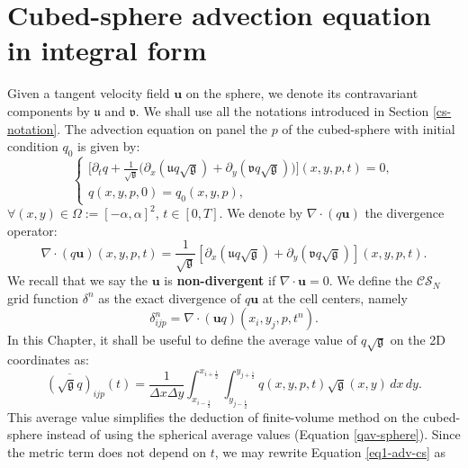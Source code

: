 \section{Cubed-sphere advection equation in integral form}
\label{chp-cs-adv}
Given a tangent velocity field $\boldsymbol{u}$ on the sphere, we denote its
contravariant components by $\mathfrak{u}$ and $\mathfrak{v}$.
We shall use all the notations introduced in Section \ref{cs-notation}.
The advection equation on panel the $p$ of the cubed-sphere with initial condition $q_0$ is given by:
\begin{equation}
	\begin{cases}
		\label{eq1-adv-cs}
		\bigg[{\partial}_t{q}+
		\frac{1}{\sqrt{\mathfrak{g}}}\bigg(
		{\partial}_x{(\mathfrak{u} q \sqrt{\mathfrak{g}})}+
		{\partial}_y{(\mathfrak{v} q \sqrt{\mathfrak{g}})}
		\bigg)\bigg](x,y,p,t)
		= 0,\\
		q(x,y,p,0) = q_0(x,y,p),
	\end{cases}
\end{equation}
$\forall (x,y) \in \Omega := [-\alpha,\alpha]^2$, $t\in[0,T]$.
We denote by $\nabla \cdot (q\boldsymbol{u})$ the divergence operator:
\begin{equation}
	\label{advcs:eqdiv}
	\nabla \cdot (q\boldsymbol{u})(x, y, p, t) =  \frac{1}{\sqrt{\mathfrak{g}}}
	[{\partial_x (\mathfrak{u}q\sqrt{\mathfrak{g}})} + {\partial_y (\mathfrak{v}q\sqrt{\mathfrak{g}})}](x, y, p, t).
\end{equation}
We recall that we say the $\boldsymbol{u}$ is \textbf{non-divergent} if $\nabla \cdot \boldsymbol{u}=0$.
We define the $\mathcal{CS}_N$ grid function $\delta^n$ as
the exact divergence of $q\boldsymbol{u}$ at the cell centers, namely
\begin{equation}
	\label{cs-discrete-div}
	\delta^n_{ijp} = \nabla \cdot (\boldsymbol{u}q)(x_i,y_j,p,t^n).
\end{equation}
In this Chapter, it shall be useful to define the average value of $q\sqrt{\mathfrak{g}}$ on the 2D coordinates as:
\begin{equation}
\label{cs-q-av}
\overline{(\sqrt{\mathfrak{g}}q)}_{ijp}(t) = \frac{1}{\Delta x \Delta y}
\int_{x_{i-\frac{1}{2}}}^{x_{i+\frac{1}{2}}}
\int_{y_{j-\frac{1}{2}}}^{y_{j+\frac{1}{2}}}  q(x,y,p,t) {\sqrt{\mathfrak{g}}(x,y)}\,dx \,dy.
\end{equation}
This average value simplifies the deduction of finite-volume method on the cubed-sphere instead of using the spherical average values (Equation \eqref{qav-sphere}).
Since the metric term does not depend on $t$, we may rewrite Equation \eqref{eq1-adv-cs} as

